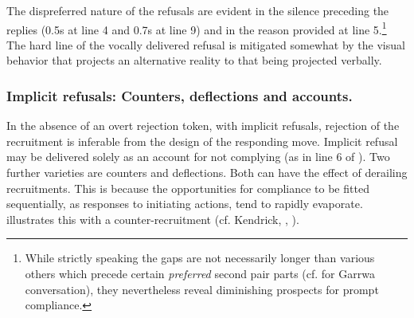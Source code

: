 \documentclass[output=paper,nonflat,colorlinks,citecolor=brown]{langsci/langscibook}
\begin{document}
The dispreferred nature of the refusals are evident in the silence preceding the replies (0.5s at line 4 and 0.7s at line 9) and in the reason provided at line 5.\footnote{While strictly speaking the gaps are not necessarily longer than various others which precede certain \textit{preferred} second pair parts (cf. \citealt{Gardner2015} for Garrwa conversation), they nevertheless reveal diminishing prospects for prompt compliance.} The hard line of the vocally delivered refusal is mitigated somewhat by the visual behavior that projects an alternative reality to that being projected verbally.


\subsubsection{Implicit refusals: Counters, deflections and accounts.}\label{sec:blythe:4.2.2}

In the absence of an overt rejection token, with implicit refusals, rejection of the recruitment is inferable from the design of the responding move. Implicit refusal may be delivered solely as an account for not complying (as in line 6 of ). Two further varieties are counters and deflections. Both can have the effect of derailing recruitments. This is because the opportunities for compliance to be fitted sequentially, as responses to initiating actions, tend to rapidly evaporate.  illustrates this with a counter-recruitment (cf. Kendrick, , ).
\end{document}
